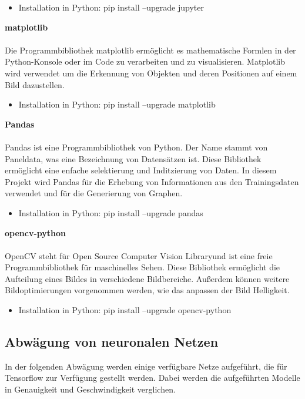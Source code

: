 \documentclass[a4paper,12pt,oneside]{article}
\begin{document}
\begin{itemize}
\item Installation in Python: pip install --upgrade jupyter
  \end{itemize}
  
\textbf{matplotlib}\\\\
Die Programmbibliothek matplotlib ermöglicht es mathematische Formlen in der Python-Konsole oder im Code zu verarbeiten und zu visualisieren.
Matplotlib wird verwendet um die Erkennung von Objekten und deren Positionen auf einem Bild dazustellen.

  \begin{itemize}
\item Installation in Python: pip install --upgrade matplotlib
  \end{itemize}
  
\textbf{Pandas}\\\\
Pandas ist eine Programmbibliothek von Python. Der Name stammt von \glqq Paneldata\grqq, was eine Bezeichnung von Datensätzen ist. Diese Bibliothek ermöglicht eine enfache selektierung und Inditzierung von Daten. In diesem Projekt wird Pandas für die Erhebung von Informationen aus den Trainingsdaten verwendet und für die Generierung von Graphen.

  \begin{itemize}
\item Installation in Python: pip install --upgrade pandas
  \end{itemize}
  
\textbf{opencv-python}\\\\
OpenCV steht für \glqq Open Source Computer Vision Library\grqq  und ist eine freie Programmbibliothek für maschinelles Sehen. Diese Bibliothek ermöglicht die Aufteilung eines Bildes in verschiedene Bildbereiche. Außerdem können weitere Bildoptimierungen vorgenommen werden, wie das anpassen der Bild Helligkeit.

  \begin{itemize}
\item Installation in Python: pip install --upgrade opencv-python
  \end{itemize}

  \subsection{Abwägung von neuronalen Netzen} 
In der folgenden Abwägung werden einige verfügbare Netze aufgeführt, die für Tensorflow zur Verfügung gestellt werden. Dabei werden die aufgeführten Modelle in Genauigkeit und Geschwindigkeit verglichen.
 
\end{document}
